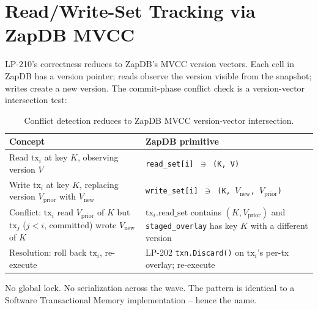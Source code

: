 \section{Read/Write-Set Tracking via ZapDB MVCC}

LP-210's correctness reduces to ZapDB's MVCC version vectors. Each
cell in ZapDB has a version pointer; reads observe the version
visible from the snapshot; writes create a new version. The
commit-phase conflict check is a version-vector intersection test:

\begin{table}[h]
\centering
\small
\begin{tabular}{@{}p{6cm}p{7cm}@{}}
\toprule
\textbf{Concept} & \textbf{ZapDB primitive} \\
\midrule
Read $\textrm{tx}_i$ at key $K$, observing version $V$ &
  \texttt{read\_set[i] $\ni$ (K, V)} \\
Write $\textrm{tx}_i$ at key $K$, replacing version $V_{\textrm{prior}}$ with $V_{\textrm{new}}$ &
  \texttt{write\_set[i] $\ni$ (K, $V_{\textrm{new}}$, $V_{\textrm{prior}}$)} \\
Conflict: $\textrm{tx}_i$ read $V_{\textrm{prior}}$ of $K$ but $\textrm{tx}_j$ ($j<i$, committed) wrote $V_{\textrm{new}}$ of $K$ &
  $\textrm{tx}_i.\textrm{read\_set}$ contains $(K, V_{\textrm{prior}})$ and \texttt{staged\_overlay} has key $K$ with a different version \\
Resolution: roll back $\textrm{tx}_i$, re-execute &
  LP-202 \texttt{txn.Discard()} on $\textrm{tx}_i$'s per-tx overlay; re-execute \\
\bottomrule
\end{tabular}
\caption{Conflict detection reduces to ZapDB MVCC version-vector
intersection.}
\label{tab:mvcc}
\end{table}

No global lock. No serialization across the wave. The pattern is
identical to a Software Transactional Memory implementation -- hence
the name.
